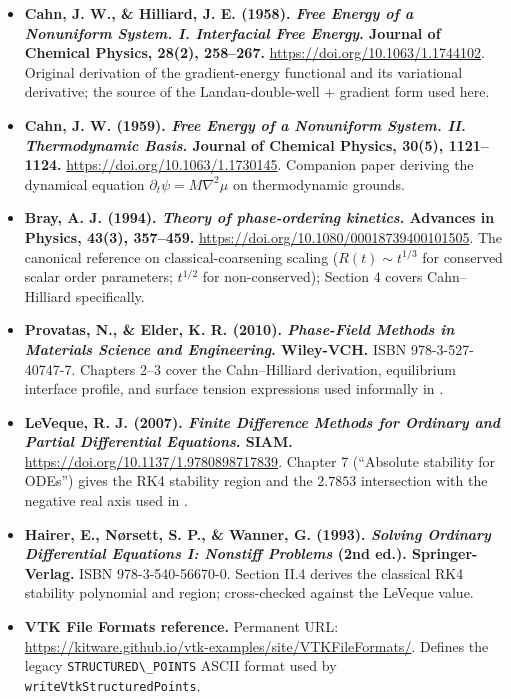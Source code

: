 \begin{itemize}
\tightlist
\item
  \textbf{Cahn, J. W., \& Hilliard, J. E. (1958). \emph{Free Energy
  of a Nonuniform System. I. Interfacial Free Energy}. Journal of
  Chemical Physics, 28(2), 258--267.}
  \url{https://doi.org/10.1063/1.1744102}. Original derivation of the
  gradient-energy functional and its variational derivative; the
  source of the Landau-double-well + gradient form used here.
\item
  \textbf{Cahn, J. W. (1959). \emph{Free Energy of a Nonuniform
  System. II. Thermodynamic Basis}. Journal of Chemical Physics,
  30(5), 1121--1124.} \url{https://doi.org/10.1063/1.1730145}.
  Companion paper deriving the dynamical equation
  \(\partial_t\psi = M\nabla^2\mu\) on thermodynamic grounds.
\item
  \textbf{Bray, A. J. (1994). \emph{Theory of phase-ordering
  kinetics}. Advances in Physics, 43(3), 357--459.}
  \url{https://doi.org/10.1080/00018739400101505}. The canonical
  reference on classical-coarsening scaling (\(R(t)\sim t^{1/3}\) for
  conserved scalar order parameters; \(t^{1/2}\) for non-conserved);
  Section 4 covers Cahn--Hilliard specifically.
\item
  \textbf{Provatas, N., \& Elder, K. R. (2010). \emph{Phase-Field
  Methods in Materials Science and Engineering}. Wiley-VCH.} ISBN
  978-3-527-40747-7. Chapters 2--3 cover the Cahn--Hilliard
  derivation, equilibrium interface profile, and surface tension
  expressions used informally in
  .
\item
  \textbf{LeVeque, R. J. (2007). \emph{Finite Difference Methods for
  Ordinary and Partial Differential Equations}. SIAM.}
  \url{https://doi.org/10.1137/1.9780898717839}. Chapter 7 (``Absolute
  stability for ODEs'') gives the RK4 stability region and the
  \(2.7853\) intersection with the negative real axis used in
  .
\item
  \textbf{Hairer, E., Nørsett, S. P., \& Wanner, G. (1993).
  \emph{Solving Ordinary Differential Equations I: Nonstiff
  Problems} (2nd ed.). Springer-Verlag.} ISBN 978-3-540-56670-0.
  Section II.4 derives the classical RK4 stability polynomial and
  region; cross-checked against the LeVeque value.
\item
  \textbf{VTK File Formats reference.} Permanent URL:
  \url{https://kitware.github.io/vtk-examples/site/VTKFileFormats/}.
  Defines the legacy \passthrough{\lstinline!STRUCTURED\_POINTS!}
  ASCII format used by \passthrough{\lstinline!writeVtkStructuredPoints!}.
\end{itemize}

